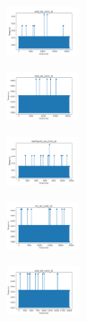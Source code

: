 \begin{figure}[H]
\begin{subfigure}
    \end{subfigure}
    \hfill
    \begin{subfigure}
        \centering
        \includegraphics[width=0.234\textwidth]{img/hs/ecoli_set_const_10_589741062_time.png}
    \end{subfigure}
    \hfill
    \begin{subfigure}
        \centering
        \includegraphics[width=0.234\textwidth]{img/hs/rand_set_const_10_589741062_time.png}
    \end{subfigure}
    \hfill
    \begin{subfigure}
        \centering
        \includegraphics[width=0.234\textwidth]{img/hs/newthyroid_set_const_10_589741062_time.png}
    \end{subfigure}
    \hfill
    \begin{subfigure}
        \centering
        \includegraphics[width=0.234\textwidth]{img/hs/iris_set_const_10_277451237_time.png}
    \end{subfigure}
    \hfill
    \begin{subfigure}
        \centering
        \includegraphics[width=0.234\textwidth]{img/hs/ecoli_set_const_10_277451237_time.png}
    \end{subfigure}
    \hfill
    \begin{subfigure}

\end{subfigure}
\end{figure}
